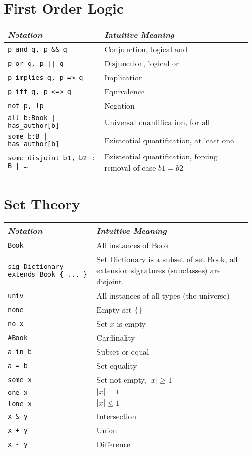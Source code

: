 \documentclass{article}
\newlength\tw
\begin{document}
\section{First Order Logic}

\begin{longtable}{|p{\tw}|p{\tw}|}
\hline
\emph{Notation} & \emph{Intuitive Meaning} \\
\hline
\texttt{p and q, p \&\& q} & Conjunction, logical and \\
\hline
\texttt{p or q, p || q} & Disjunction, logical or\\
\hline
\texttt{p implies q, p => q} & Implication \\
\hline
\texttt{p iff q, p <=> q} & Equivalence \\
\hline
\texttt{not p, !p} & Negation \\
\hline
\texttt{all b:Book | has\_author[b]} & Universal quantification, for all \\
\hline
\texttt{some b:B | has\_author[b]} & Existential quantification, at least one \\
\hline
\texttt{some disjoint b1, b2 : B | \ldots} & Existential quantification, forcing removal of case $b1=b2$\\
\hline
\end{longtable}

\section{Set Theory}

\begin{longtable}{|p{\tw}|p{\tw}|}
\hline
\emph{Notation} & \emph{Intuitive Meaning} \\
\hline
\texttt{Book} & All instances of Book \\
\hline
\texttt{sig Dictionary extends Book \{ ... \}} & Set Dictionary is a subset of set Book, all extension signatures (subclasses) are disjoint. \\
\hline
\texttt{univ} & All instances of all types (the universe) \\
\hline
\texttt{none} & Empty set \{\} \\
\hline
\texttt{no x} & Set $x$ is empty\\
\hline
\texttt{\#Book} & Cardinality \\
\hline
\texttt{a in b} & Subset or equal\\
\hline
\texttt{a = b} & Set equality\\
\hline
\texttt{some x} & Set not empty, $|x|\geq1$\\
\hline
\texttt{one x} & $|x|=1$ \\
\hline
\texttt{lone x} & $|x|\leq1$\\
\hline
\texttt{x \& y} & Intersection\\
\hline
\texttt{x + y } & Union\\
\hline
\texttt{x - y} & Difference\\
\hline
\end{longtable}
\end{document}
